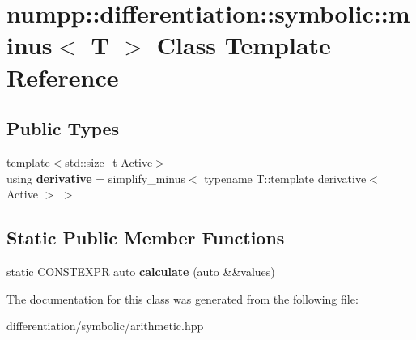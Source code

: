 \hypertarget{classnumpp_1_1differentiation_1_1symbolic_1_1minus}{}\section{numpp\+:\+:differentiation\+:\+:symbolic\+:\+:minus$<$ T $>$ Class Template Reference}
\label{classnumpp_1_1differentiation_1_1symbolic_1_1minus}
\subsection*{Public Types}
\begin{DoxyCompactItemize}
\item 
\mbox{\label{classnumpp_1_1differentiation_1_1symbolic_1_1minus_a97777152969bcec3ea15ab321bd772c7}} 
{\footnotesize template$<$std\+::size\+\_\+t Active$>$ }\\using {\bfseries derivative} = simplify\+\_\+minus$<$ typename T\+::template derivative$<$ Active $>$ $>$
\end{DoxyCompactItemize}
\subsection*{Static Public Member Functions}
\begin{DoxyCompactItemize}
\item 
\mbox{\label{classnumpp_1_1differentiation_1_1symbolic_1_1minus_a3f2703c986d72b073747f0c3590ae451}} 
static C\+O\+N\+S\+T\+E\+X\+PR auto {\bfseries calculate} (auto \&\&values)
\end{DoxyCompactItemize}


The documentation for this class was generated from the following file\+:\begin{DoxyCompactItemize}
\item 
differentiation/symbolic/arithmetic.\+hpp\end{DoxyCompactItemize}
